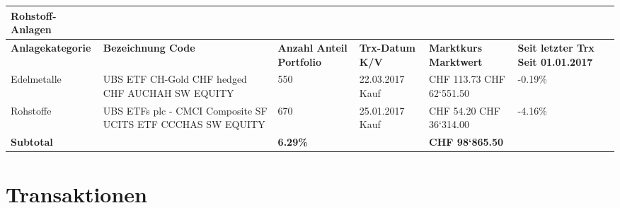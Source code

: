 \documentclass[9pt,landscape,a4paper]{report}
\begin{document}
\begin{longtable}{L{5.5cm} L{5.5cm} R{2.5cm} R{2.5cm} R{2.5cm} R{3cm}}
\normalsize \bf{Rohstoff-Anlagen} \small \newline  & & & & & \\ \toprule[1pt] \bf{Anlagekategorie} \newline \bf{} & \bf{Bezeichnung} \newline \bf{Code} & \bf{Anzahl} \newline \bf{Anteil Portfolio} & \bf{Trx-Datum} \newline \bf{K/V} & \bf{Marktkurs} \newline \bf{Marktwert} & \bf{Seit letzter Trx} \newline \bf{Seit 01.01.2017} \\ \toprule[1pt] \endhead  Edelmetalle \newline & UBS ETF CH-Gold CHF hedged CHF \newline AUCHAH SW EQUITY \newline  & 550  & 22.03.2017 \newline Kauf & CHF  113.73 \newline CHF 62`551.50 & -0.19{\%}  \\ \hline  {}  Rohstoffe \newline & UBS ETFs plc - CMCI Composite SF UCITS ETF \newline CCCHAS SW EQUITY \newline  & 670  & 25.01.2017 \newline Kauf & CHF  54.20 \newline CHF 36`314.00 & -4.16{\%}  \\ \bottomrule[1pt] \textbf{Subtotal} & & \bf{6.29}\% &  & \bf{ CHF  98`865.50} & \end{longtable}

\newpage

\section{Transaktionen}

\footnotesize  \renewcommand*{\arraystretch}{1.2}
\end{document}
